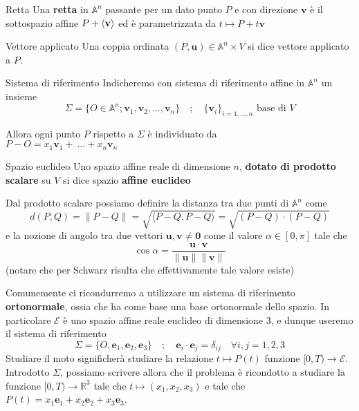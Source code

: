 \begin{definition}{Retta}
    Una \textbf{retta} in \(\mathbb{A}^{n}\) passante per un dato punto \(P\) e
    con direzione \(\mathbf{v} \) è il sottospazio affine \(P + {\left\langle\mathbf{v} \right\rangle} \) ed è
    parametrizzata da \(t \mapsto P + t \mathbf{v} \) 
\end{definition}

\begin{definition}{Vettore applicato}
    Una coppia ordinata \({(P, \mathbf{u} )} \in \mathbb{A}^{n} \times V\) si dice vettore
    applicato a \(P\).
\end{definition}

\begin{definition}{Sistema di riferimento}
    Indicheremo con sistema di riferimento affine in \(\mathbb{A}^{n}\) un
    insieme 
    \[
      \Sigma = \{O \in \mathbb{A}^{n} ; \mathbf{v} _{1}, \mathbf{v} _{2}, \dots,
      \mathbf{v} _{n}\} \quad ;
      \quad {\{\mathbf{v} _{i}\}}_{i = 1, \dots, n} \text{ base di } V
    \]
\end{definition}
\begin{remark}
    Allora ogni punto \(P\) rispetto a \(\Sigma\) è individuato da \\\(P - O =
    x_{1}\mathbf{v} _{1} +~\dots + x_{n}\mathbf{v} _{n}\) 
\end{remark}

\begin{definition}{Spazio euclideo}
    Uno spazio affine reale di dimensione \(n\), \textbf{dotato di prodotto
    scalare} su \(V\) si dice spazio \textbf{affine euclideo}
\end{definition}

Dal prodotto scalare possiamo definire la distanza tra due punti di
\(\mathbb{A}^{n}\) come
\[
d(P, Q) = \|P - Q\| = \sqrt{\langle P - Q, P - Q \rangle} = \sqrt{{(P -
    Q)} \cdot {(P - Q)}}
\]
e la nozione di angolo tra due vettori \(\mathbf{u} , \mathbf{v}  \neq \mathbf{0} \) come il valore \(\alpha
\in [0, \pi]\) tale che
\[
  \cos \alpha = \frac{\mathbf{u}  \cdot \mathbf{v} }{\|\mathbf{u} \| \|\mathbf{v} \|}
\]
(notare che per Schwarz risulta che effettivamente tale valore esiste)

Comunemente ci ricondurremo a utilizzare un sistema di riferimento
\textbf{ortonormale}, ossia che ha come base una base ortonormale dello spazio.
In particolare \(\mathcal{E}\) è uno spazio affine reale euclideo di dimensione
3, e dunque useremo il sistema di riferimento
\[
    \Sigma = \{O, \mathbf{e} _{1}, \mathbf{e} _{2}, \mathbf{e} _{3}\} \quad ; \quad \mathbf{e} _{i} \cdot \mathbf{e} _{j} =
    \delta_{ij} \quad \forall i, j = 1, 2, 3
\]
Studiare il moto significherà studiare la relazione \(t \mapsto P(t)\) funzione
\([0, T) \to \mathcal{E}\). Introdotto \(\Sigma\), possiamo scrivere allora che
il problema è ricondotto a studiare la funzione \([0, T) \to \mathbb{R}^{3}\)
tale che \(t \mapsto (x_{1}, x_{2}, x_{3})\) e tale che \(P(t) = x_{1} \mathbf{e} _{1} +
x_{2} \mathbf{e} _{2} + x_{3} \mathbf{e} _{3}\).

